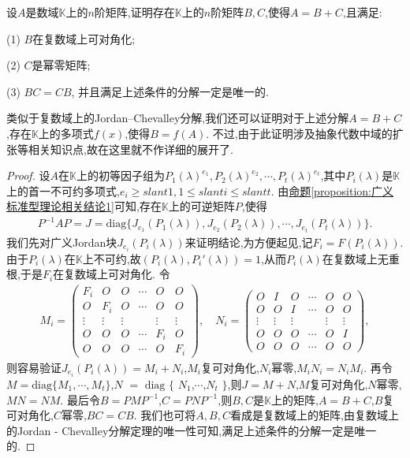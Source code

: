 \documentclass[../../main.tex]{subfiles}
\begin{document}
\begin{theorem}\label{theorem:数K上的Jordan-Chevalley分解}
设$A$是数域$\mathbb{K}$上的$n$阶矩阵,证明存在$\mathbb{K}$上的$n$阶矩阵$B,C$,使得$A = B + C$,且满足:

(1) $B$在复数域上可对角化; 

(2) $C$是幂零矩阵; 

(3) $BC = CB$,
并且满足上述条件的分解一定是唯一的.
\end{theorem}
\begin{remark}
类似于复数域上的Jordan--Chevalley分解,我们还可以证明对于上述分解$A = B + C$,存在$\mathbb{K}$上的多项式$f(x)$,使得$B = f(A)$. 不过,由于此证明涉及抽象代数中域的扩张等相关知识点,故在这里就不作详细的展开了. 
\end{remark}
\begin{proof}
设$A$在$\mathbb{K}$上的初等因子组为$P_1(\lambda)^{e_1},P_2(\lambda)^{e_2},\cdots,P_t(\lambda)^{e_t}$,其中$P_i(\lambda)$是$\mathbb{K}$上的首一不可约多项式,$e_i\geqslant slant 1, 1\leqslant slant i\leqslant slant t$. 由\hyperref[proposition:广义标准型理论相关结论1]{命题\ref{proposition:广义标准型理论相关结论1}}可知,存在$\mathbb{K}$上的可逆矩阵$P$,使得
\begin{align*}
P^{-1}AP = J=\mathrm{diag}\{J_{e_1}(P_1(\lambda)),J_{e_2}(P_2(\lambda)),\cdots,J_{e_t}(P_t(\lambda))\}.
\end{align*}
我们先对广义Jordan块$J_{e_i}(P_i(\lambda))$来证明结论,为方便起见,记$F_i = F(P_i(\lambda))$. 由于$P_i(\lambda)$在$\mathbb{K}$上不可约,故$(P_i(\lambda),P_i'(\lambda)) = 1$,从而$P_i(\lambda)$在复数域上无重根,于是$F_i$在复数域上可对角化. 令
\begin{align*}
M_i = 
\begin{pmatrix}
F_i & O & O & \cdots & O & O \\
O & F_i & O & \cdots & O & O \\
\vdots & \vdots & \vdots & & \vdots & \vdots \\
O & O & O & \cdots & F_i & O \\
O & O & O & \cdots & O & F_i
\end{pmatrix}, \quad 
N_i = 
\begin{pmatrix}
O & I & O & \cdots & O & O \\
O & O & I & \cdots & O & O \\
\vdots & \vdots & \vdots & & \vdots & \vdots \\
O & O & O & \cdots & O & I \\
O & O & O & \cdots & O & O
\end{pmatrix},
\end{align*}
则容易验证$J_{e_i}(P_i(\lambda)) = M_i + N_i$,$M_i$复可对角化,$N_i$幂零,$M_iN_i = N_iM_i$. 再令$M = \mathrm{diag}\{M_1,\cdots,M_t\}$,$N $ $=$ $\mathrm{diag}$ $\{$ $N_1$,$\cdots$,$N_t$ $\}$,则$J = M + N$,$M$复可对角化,$N$幂零,$MN = NM$. 最后令$B = PMP^{-1}$,$C = PNP^{-1}$,则$B,C$是$\mathbb{K}$上的矩阵,$A = B + C$,$B$复可对角化,$C$幂零,$BC = CB$. 我们也可将$A,B,C$看成是复数域上的矩阵,由复数域上的Jordan - Chevalley分解定理的唯一性可知,满足上述条件的分解一定是唯一的. 
\end{proof}
\end{document}
